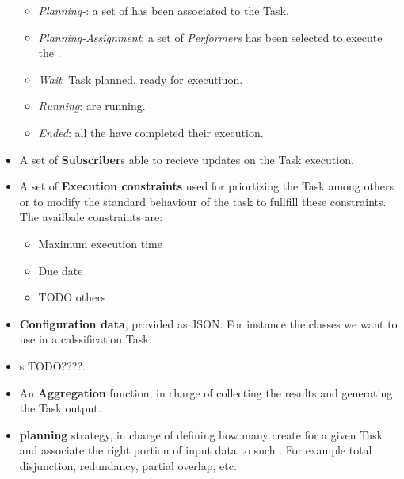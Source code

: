 \begin{itemize}
\begin{itemize}
            \item \emph{Planning-\utask{}}: a set of \utask{} has been associated
            to the Task.
            
            \item \emph{Planning-Assignment}: a set of \emph{Performers} has
            been selected to execute the \utask{}.
            
            \item \emph{Wait}: Task planned, \utask{} ready for executiuon.
            
            \item \emph{Running}: \utask{} are running.
            
            \item \emph{Ended}: all the \utask{} have completed their execution.
        \end{itemize}
    
    \item A set of \textbf{Subscriber}s able to recieve updates on the Task
    execution.

    \item A set of \textbf{Execution constraints} used for priortizing the Task
    among others or to modify the standard behaviour of the task to fullfill
    these constraints. The availbale constraints are:
        \begin{itemize}
            \item Maximum execution time
            \item Due date
            \item TODO others
        \end{itemize}

    \item \textbf{Configuration data}, provided as \ac{JSON}. For instance the
    classes we want to use in a calssification Task.

    \item \textbf{\utask{}}s TODO????.

    \item An \textbf{Aggregation} function, in charge of collecting the \utask{}
    results and generating the Task output.
    
    \item \textbf{\utask{} planning} strategy, in charge of defining how many
    \utask{} create for a given Task and associate the right portion of input
    data to such \utask{}. For example total disjunction, redundancy, partial
    overlap, etc.
    

\end{itemize}

